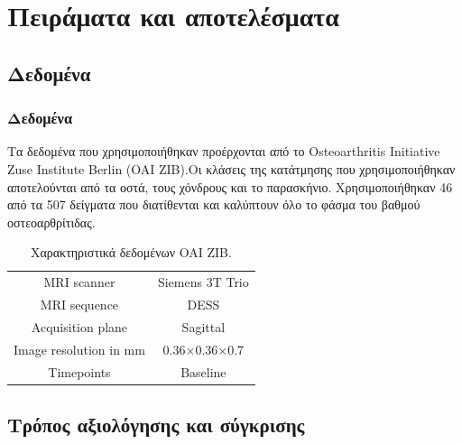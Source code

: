 \documentclass{beamer}
\begin{document}
\section{Πειράματα και αποτελέσματα}
\subsection{Δεδομένα}

\begin{frame}
\frametitle{Δεδομένα}

Τα δεδομένα που χρησιμοποιήθηκαν προέρχονται από το Osteoarthritis Initiative
Zuse Institute Berlin (OAI ZIB).Οι κλάσεις της κατάτμησης που χρησιμοποιήθηκαν
αποτελούνται από τα οστά, τους χόνδρους και το παρασκήνιο. Χρησιμοποιήθηκαν 46 από
τα 507 δείγματα που διατίθενται και καλύπτουν όλο το φάσμα του βαθμού
οστεοαρθρίτιδας.

\begin{table}[h!]
    \centering
    \begin{tabular}{|c|c|} 
        \hline
        MRI scanner            & Siemens 3T Trio \\ 
        MRI sequence           & DESS            \\
        Acquisition plane      & Sagittal        \\
        Image resolution in mm & 0.36×0.36×0.7   \\
        Timepoints             & Baseline        \\
        \hline
    \end{tabular}
    \caption{Χαρακτηριστικά δεδομένων OAI ZIB.}
    \label{dataset:1}
\end{table}


\end{frame}


\subsection{Τρόπος αξιολόγησης και σύγκρισης}
\end{document}
